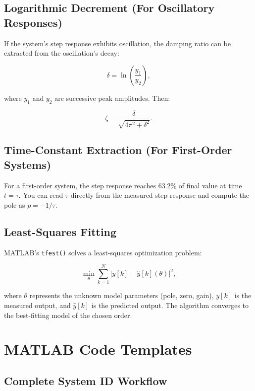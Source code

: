 \documentclass[11pt,letterpaper]{article}
\begin{document}
\subsection{Logarithmic Decrement (For Oscillatory Responses)}

If the system's step response exhibits oscillation, the damping ratio can be extracted from the oscillation's decay:

\begin{equation}
\delta = \ln\left(\frac{y_1}{y_2}\right),
\end{equation}

\noindent
where $y_1$ and $y_2$ are successive peak amplitudes. Then:

\begin{equation}
\zeta = \frac{\delta}{\sqrt{4\pi^2 + \delta^2}}.
\end{equation}

\subsection{Time-Constant Extraction (For First-Order Systems)}

For a first-order system, the step response reaches 63.2\% of final value at time $t = \tau$. You can read $\tau$ directly from the measured step response and compute the pole as $p = -1/\tau$.

\subsection{Least-Squares Fitting}

MATLAB's \texttt{tfest()} solves a least-squares optimization problem:

\begin{equation}
\min_{\theta} \sum_{k=1}^N |y[k] - \hat{y}[k](\theta)|^2,
\end{equation}

\noindent
where $\theta$ represents the unknown model parameters (pole, zero, gain), $y[k]$ is the measured output, and $\hat{y}[k]$ is the predicted output. The algorithm converges to the best-fitting model of the chosen order.

\section{MATLAB Code Templates}

\subsection{Complete System ID Workflow}
\end{document}
